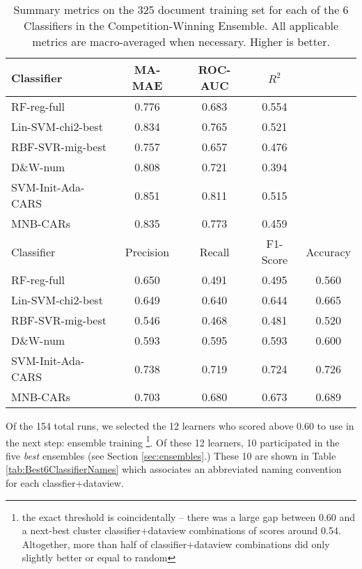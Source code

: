 \begin{table}[]
\centering
    \begin{tabular}{|l|c|c|c|c|}
        \hline
        \textsf{ Classifier } & \textsf{ MA-MAE } & \textsf{ ROC-AUC } & \textsf{ $R^2$ } & \\
        \hline
      \cellcolor{gray!15} \textsf{ RF-reg-full } & 0.776 & 0.683 & \cellcolor{gray!15} 0.554 & \\
       \cellcolor{gray!15} \textsf{ Lin-SVM-chi2-best } & 0.834 & 0.765 & 0.521 & \\ 
       \cellcolor{gray!15} \textsf{ RBF-SVR-mig-best } & 0.757 & 0.657 & 0.476 & \\ 
       \cellcolor{gray!15} \textsf{ D\&W-num } & 0.808 & 0.721 & 0.394 & \\ 
       \cellcolor{gray!15} \textsf{ SVM-Init-Ada-CARS } & \cellcolor{gray!15} 0.851 & \cellcolor{gray!15} 0.811 & 0.515 & \\ 
       \cellcolor{gray!15} \textsf{ MNB-CARs } & 0.835 & 0.773 & 0.459 & \\
        \hline

    \textsf{ Classifier } & \textsf{ Precision } & \textsf{ Recall } & \textsf{ F1-Score } & \textsf{ Accuracy } \\ 
    \hline
    \cellcolor{gray!15} \textsf{ RF-reg-full } & 0.650 & 0.491 & 0.495 & 0.560 \\ 
   \cellcolor{gray!15} \textsf{ Lin-SVM-chi2-best } & 0.649 & 0.640 & 0.644 & 0.665 \\ 
   \cellcolor{gray!15} \textsf{ RBF-SVR-mig-best } & 0.546 & 0.468 & 0.481 & 0.520 \\ 
   \cellcolor{gray!15} \textsf{ D\&W-num } & 0.593 & 0.595 & 0.593 & 0.600 \\ 
   \cellcolor{gray!15} \textsf{ SVM-Init-Ada-CARS } & \cellcolor{gray!15} 0.738 & \cellcolor{gray!15} 0.719 & \cellcolor{gray!15} 0.724 & \cellcolor{gray!15} 0.726 \\ 
   \cellcolor{gray!15} \textsf{ MNB-CARs } & 0.703 & 0.680 & 0.673 & 0.689 \\
   \hline
    \end{tabular}
    \caption{Summary metrics on the 325 document training set for each of the 6 Classifiers in the Competition-Winning Ensemble. All applicable metrics are macro-averaged when necessary. Higher is better.}
    \label{tab:BestEnsembleClassifiersMAMetrics2}
\end{table}

Of the 154 total runs, we selected the 12 learners who scored above 0.60
to use in the next step: ensemble training \footnote{the exact threshold is coincidentally -- there was a large gap between 0.60 and a next-best cluster classifier+dataview combinations of scores around 0.54. Altogether, more than half of classifier+dataview combinations did only slightly better or equal to random}.  Of these 12 learners, 10 participated in the five \textit{best} ensembles (see Section \ref{sec:ensembles}.) These 10 are shown in Table \ref{tab:Best6ClassifierNames}
 which associates an abbreviated naming convention for each classfier+dataview.

